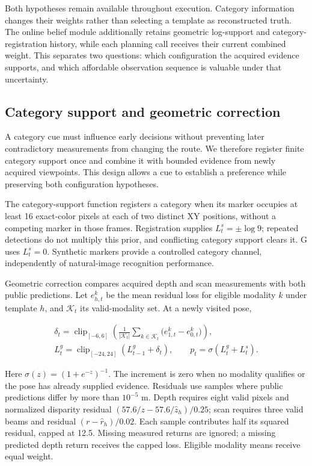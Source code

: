 \documentclass[11pt,a4paper]{article}
\providecommand{\hypertarget}[2]{#2}
\begin{document}
Both hypotheses remain available throughout execution. Category information changes their weights rather than selecting a template as reconstructed truth. The online belief module additionally retains geometric log-support and category-registration history, while each planning call receives their current combined weight. This separates two questions: which configuration the acquired evidence supports, and which affordable observation sequence is valuable under that uncertainty.

\hypertarget{category-support-and-geometric-correction}{%
\subsection{Category support and geometric correction}\label{category-support-and-geometric-correction}}

A category cue must influence early decisions without preventing later contradictory measurements from changing the route. We therefore register finite category support once and combine it with bounded evidence from newly acquired viewpoints. This design allows a cue to establish a preference while preserving both configuration hypotheses.

The category-support function registers a category when its marker occupies at least 16 exact-color pixels at each of two distinct XY positions, without a competing marker in those frames. Registration supplies \(L_t^s=\pm\log9\); repeated detections do not multiply this prior, and conflicting category support clears it. G uses \(L_t^s=0\). Synthetic markers provide a controlled category channel, independently of natural-image recognition performance.

Geometric correction compares acquired depth and scan measurements with both public predictions. Let \(e_{h,t}^{k}\) be the mean residual loss for eligible modality \(k\) under template \(h\), and \(\mathcal K_t\) its valid-modality set. At a newly visited pose,

\[
\begin{aligned}
\delta_t=\operatorname{clip}_{[-6,6]}
\left(\frac{1}{|\mathcal K_t|}\sum_{k\in\mathcal K_t}
\bigl(e_{1,t}^{k}-e_{0,t}^{k}\bigr)\right),\\
L_t^g=\operatorname{clip}_{[-24,24]}(L_{t-1}^g+\delta_t),\qquad
p_t=\sigma(L_t^g+L_t^s).
\end{aligned}
\]

Here \(\sigma(z)=(1+e^{-z})^{-1}\). The increment is zero when no modality qualifies or the pose has already supplied evidence. Residuals use samples where public predictions differ by more than \(10^{-5}\) m. Depth requires eight valid pixels and normalized disparity residual \((57.6/z-57.6/\widehat z_h)/0.25\); scan requires three valid beams and residual \((r-\widehat r_h)/0.02\). Each sample contributes half its squared residual, capped at 12.5. Missing measured returns are ignored; a missing predicted depth return receives the capped loss. Eligible modality means receive equal weight.
\end{document}
